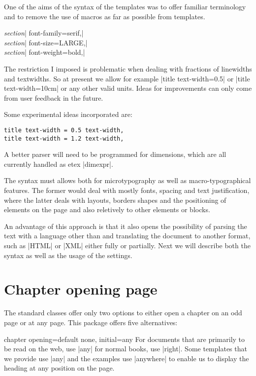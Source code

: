 One of the aims of the syntax of the templates was to offer familiar terminology and to remove the use
of \tex macros as far as possible from templates. 
\medskip

{\parindent0pt

 \textit{section}| font-family=serif,|\\
 \textit{section}| font-size=LARGE,|\\
 \textit{section}| font-weight=bold,|\\
}

The restriction I imposed is problematic when dealing with fractions of linewidths and textwidths. So
at present we allow for example |title text-width=0.5\texwidth| or |title text-width=10cm| or any other valid units. Ideas for improvements can only come from user feedback in the future.

Some experimental ideas incorporated are:

\begin{verbatim}
title text-width = 0.5 text-width,
title text-width = 1.2 text-width,
\end{verbatim}

A better parser will need to be programmed for dimensions, which are all currently handled as etex |dimexpr|. 

The syntax must allows both for microtypography as well as macro-typographical features. The former would deal with mostly fonts, spacing and text justification, where the latter deals with layouts, borders shapes and the positioning of elements on the page and also reletively to other elements or blocks.

An advantage of this approach is that it also opens the possibility of parsing the text with a language other than \tex and translating the document to another format, such as |HTML| or |XML| either fully or partially. Next we will describe both the syntax as well as the usage of the settings.

\section{Chapter opening page}

The standard \latexe classes offer only two options to either open a chapter on an odd page or at any page. This package offers five alternatives:

\begin{docKey}[phd]{chapter opening}{=}{default none, initial=any}
For documents that are primarily to be read on the web, use |any| for normal books, use |right|. Some templates that we provide use |any| and the examples use |anywhere| to enable us to display the heading at any position on the page.
\end{docKey}

